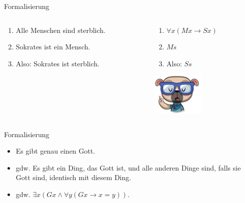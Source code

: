 \documentclass[12pt]{beamer}
\begin{document}
\begin{frame}{Formalisierung}
  
  \begin{columns}

    \begin{column}[t]{5cm}
      \begin{enumerate}[<+->]
      \item Alle Menschen sind sterblich.
      \item Sokrates ist ein Mensch.
      \item Also: Sokrates ist sterblich.
      \end{enumerate}
    \end{column}

    \begin{column}[t]{5cm}
      \begin{enumerate}[<+->]
      \item $\forall x (Mx \to Sx)$
      \item $Ms$
      \item Also: $Ss$

      \end{enumerate}
      \pause
      \begin{center}
        \includegraphics[height=2cm]{cleverdog.png}

      \end{center}

    \end{column}

  \end{columns}

\end{frame}

\begin{frame}{Formalisierung}
  \begin{itemize}
  \item<1-> Es gibt genau einen Gott.
  \item<2-> gdw. Es gibt ein Ding, das Gott ist, und alle anderen
    Dinge sind, falls sie Gott sind, identisch mit diesem Ding.
  \item<3-> gdw. $\exists x(Gx \land \forall y(Gx \to x=y))$.
  \end{itemize}
\end{frame}
\end{document}
